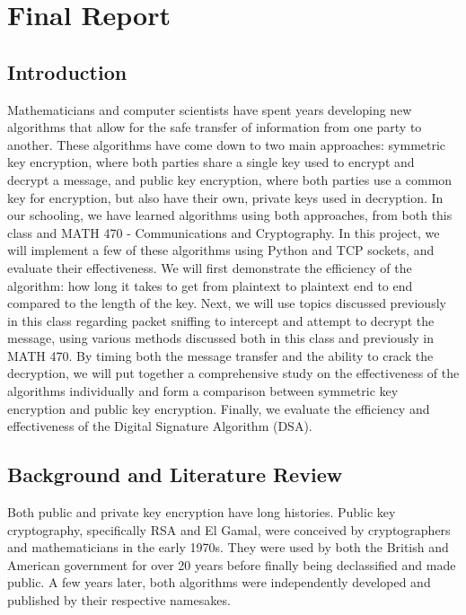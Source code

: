 \documentclass[12pt]{report}
\begin{document}
\chapter{Final Report}
\section{Introduction}
Mathematicians and computer scientists have spent years developing new algorithms that allow for the safe transfer of information from one party to another. These algorithms have come down to two main approaches: symmetric key encryption, where both parties share a single key used to encrypt and decrypt a message, and public key encryption, where both parties use a common key for encryption, but also have their own, private keys used in decryption. In our schooling, we have learned algorithms using both approaches, from both this class and MATH 470 - Communications and Cryptography. In this project, we will implement a few of these algorithms using Python and TCP sockets, and evaluate their effectiveness. We will first demonstrate the efficiency of the algorithm: how long it takes to get from plaintext to plaintext end to end compared to the length of the key. Next, we will use topics discussed previously in this class regarding packet sniffing to intercept and attempt to decrypt the message, using various methods discussed both in this class and previously in MATH 470. By timing both the message transfer and the ability to crack the decryption, we will put together a comprehensive study on the effectiveness of the algorithms individually and form a comparison between symmetric key encryption and public key encryption. Finally, we evaluate the efficiency and effectiveness of the Digital Signature Algorithm (DSA).

\section{Background and Literature Review}
Both public and private key encryption have long histories.\cite{first-ten} Public key cryptography, specifically RSA and El Gamal, were conceived by cryptographers and mathematicians in the early 1970s.\cite{ieee}\cite{rsa} They were used by both the British and American government for over 20 years before finally being declassified and made public. A few years later, both algorithms were independently developed and published by their respective namesakes.
\end{document}
